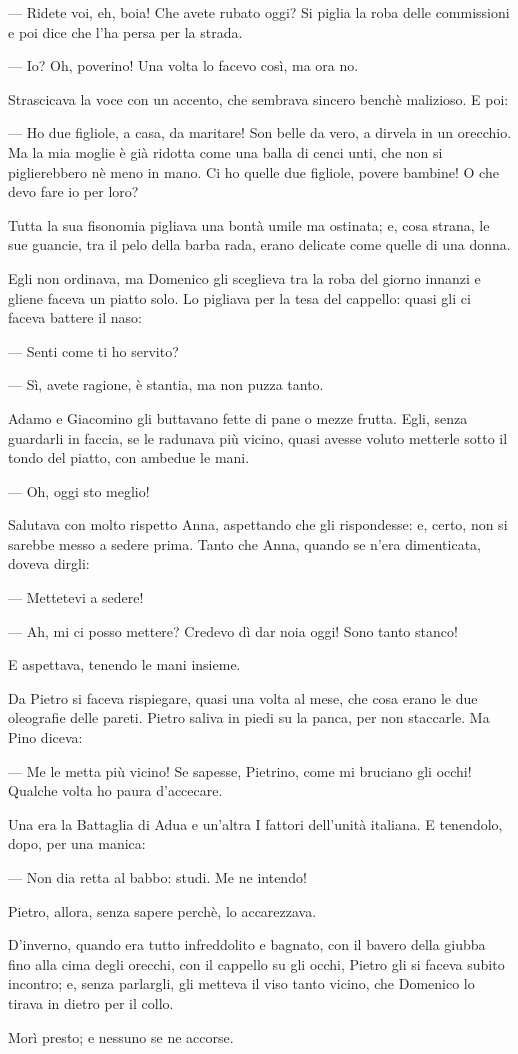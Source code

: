 — Ridete voi, eh, boia! Che avete rubato oggi? Si piglia la roba delle commissioni e poi dice che l’ha persa per la strada.

— Io? Oh, poverino! Una volta lo facevo così, ma ora no.

Strascicava la voce con un accento, che sembrava sincero benchè malizioso. E poi:

— Ho due figliole, a casa, da maritare! Son belle da vero, a dirvela in un orecchio. Ma la mia moglie è già ridotta come una balla di cenci unti, che non si piglierebbero nè meno in mano. Ci ho quelle due figliole, povere bambine! O che devo fare io per loro?

Tutta la sua fisonomia pigliava una bontà umile ma ostinata; e, cosa strana, le sue guancie, tra il pelo della barba rada, erano delicate come quelle di una donna.

Egli non ordinava, ma Domenico gli sceglieva tra la roba del giorno innanzi e gliene faceva un piatto solo. Lo pigliava per la tesa del cappello: quasi gli ci faceva battere il naso:

— Senti come ti ho servito?

— Sì, avete ragione, è stantia, ma non puzza tanto.

Adamo e Giacomino gli buttavano fette di pane o mezze frutta. Egli, senza guardarli in faccia, se le radunava più vicino, quasi avesse voluto metterle sotto il tondo del piatto, con ambedue le mani.

— Oh, oggi sto meglio!

Salutava con molto rispetto Anna, aspettando che gli rispondesse: e, certo, non si sarebbe messo a sedere prima. Tanto che Anna, quando se n’era dimenticata, doveva dirgli:

— Mettetevi a sedere!

— Ah, mi ci posso mettere? Credevo dì dar noia oggi! Sono tanto stanco!

E aspettava, tenendo le mani insieme.

Da Pietro si faceva rispiegare, quasi una volta al mese, che cosa erano le due oleografie delle pareti. Pietro saliva in piedi su la panca, per non staccarle. Ma Pino diceva:

— Me le metta più vicino! Se sapesse, Pietrino, come mi bruciano gli occhi! Qualche volta ho paura d’accecare.

Una era la Battaglia di Adua e un’altra I fattori dell’unità italiana. E tenendolo, dopo, per una manica:

— Non dia retta al babbo: studi. Me ne intendo!

Pietro, allora, senza sapere perchè, lo accarezzava.

D’inverno, quando era tutto infreddolito e bagnato, con il bavero della giubba fino alla cima degli orecchi, con il cappello su gli occhi, Pietro gli si faceva subito incontro; e, senza parlargli, gli metteva il viso tanto vicino, che Domenico lo tirava in dietro per il collo.

Morì presto; e nessuno se ne accorse.
